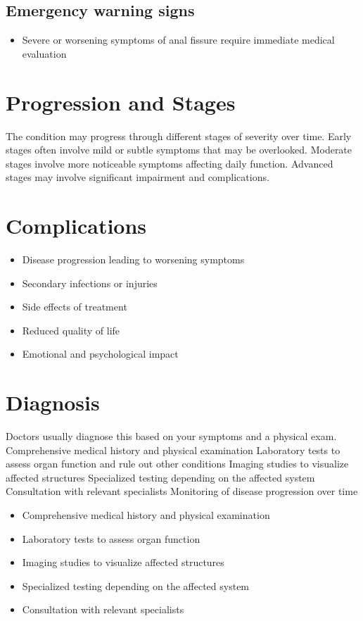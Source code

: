 \subsection{Emergency warning signs}
\begin{itemize}[noitemsep]
  \item Severe or worsening symptoms of anal fissure require immediate medical evaluation
\end{itemize}
\section{Progression and Stages}
The condition may progress through different stages of severity over time. Early stages often involve mild or subtle symptoms that may be overlooked. Moderate stages involve more noticeable symptoms affecting daily function. Advanced stages may involve significant impairment and complications.
\section{Complications}
\begin{itemize}[noitemsep]
  \item Disease progression leading to worsening symptoms
  \item Secondary infections or injuries
  \item Side effects of treatment
  \item Reduced quality of life
  \item Emotional and psychological impact
\end{itemize}
\section{Diagnosis}
Doctors usually diagnose this based on your symptoms and a physical exam. Comprehensive medical history and physical examination Laboratory tests to assess organ function and rule out other conditions Imaging studies to visualize affected structures Specialized testing depending on the affected system Consultation with relevant specialists Monitoring of disease progression over time

\begin{itemize}[noitemsep]
  \item Comprehensive medical history and physical examination
  \item Laboratory tests to assess organ function
  \item Imaging studies to visualize affected structures
  \item Specialized testing depending on the affected system
  \item Consultation with relevant specialists
\end{itemize}
